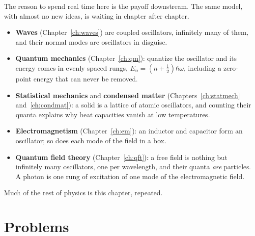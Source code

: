 The reason to spend real time here is the payoff downstream. The same model, with almost no new ideas, is waiting in chapter after chapter.
\begin{itemize}[itemsep=3pt]
  \item \textbf{Waves} (Chapter~\ref{ch:waves}) are coupled oscillators, infinitely many of them, and their normal modes are oscillators in disguise.
  \item \textbf{Quantum mechanics} (Chapter~\ref{ch:qm}): quantize the oscillator and its energy comes in evenly spaced rungs, $E_n = (n+\tfrac12)\hbar\omega$, including a zero-point energy that can never be removed.
  \item \textbf{Statistical mechanics} and \textbf{condensed matter} (Chapters~\ref{ch:statmech} and~\ref{ch:condmat}): a solid is a lattice of atomic oscillators, and counting their quanta explains why heat capacities vanish at low temperatures.
  \item \textbf{Electromagnetism} (Chapter~\ref{ch:em}): an inductor and capacitor form an oscillator; so does each mode of the field in a box.
  \item \textbf{Quantum field theory} (Chapter~\ref{ch:qft}): a free field is nothing but infinitely many oscillators, one per wavelength, and their quanta \emph{are} particles. A photon is one rung of excitation of one mode of the electromagnetic field.
\end{itemize}
Much of the rest of physics is this chapter, repeated.

\section{Problems}


